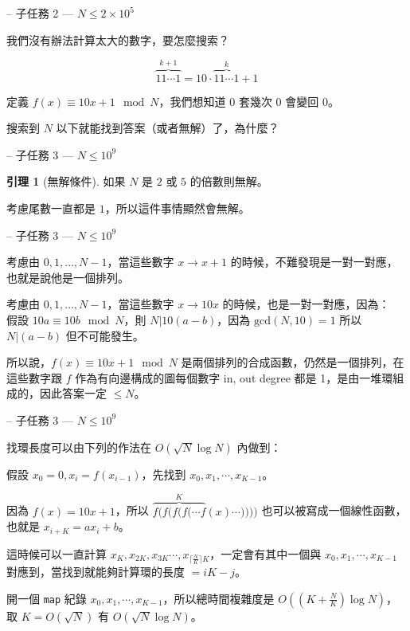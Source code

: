 \documentclass[hyperref,UTF8,notheorems,xcolor={dvipsnames}]{beamer}
\newcommand{\btitle}[1]{{\secname} -- #1}
\theoremstyle{definition}
\newtheorem{lemma}{引理}
\begin{document}
\begin{frame}[fragile]{\btitle{子任務 2 --- $N \leq 2 \times 10^5$}}
	
	我們沒有辦法計算太大的數字，要怎麼搜索？

	{
		\[ \overset{k+1}{\overbrace{11\cdots1}} = 10 \cdot \overset{k}{\overbrace{11\cdots1}} + 1 \]

		定義 $f(x) \equiv 10 x + 1 \mod N$，我們想知道 $0$ 套幾次 $0$ 會變回 $0$。  

		搜索到 $N$ 以下就能找到答案（或者無解）了，為什麼？  
	}

\end{frame}

\begin{frame}[fragile]{\btitle{子任務 3 --- $N \leq 10^9$}}
	
	\begin{lemma}[無解條件]
		如果 $N$ 是 $2$ 或 $5$ 的倍數則無解。  
	\end{lemma}

	考慮尾數一直都是 $1$，所以這件事情顯然會無解。  

\end{frame}

\begin{frame}[fragile]{\btitle{子任務 3 --- $N \leq 10^9$}}
	
	考慮由 $0, 1, \ldots, N - 1$，當這些數字 $x \rightarrow x + 1$ 的時候，不難發現是一對一對應，也就是說他是一個排列。  

	考慮由 $0, 1, \ldots, N - 1$，當這些數字 $x \rightarrow 10x$ 的時候，也是一對一對應，因為：\\
	假設 $10a \equiv 10b \mod N$，則 $N | 10(a - b)$，因為 $\mathrm{gcd}(N, 10) = 1$ 所以 $N | (a - b)$ 但不可能發生。  
	
	所以說，$f(x) \equiv 10 x + 1 \mod N$ 是兩個排列的合成函數，仍然是一個排列，在這些數字跟 $f$ 作為有向邊構成的圖每個數字 in, out degree 都是 1，是由一堆環組成的，因此答案一定 $\leq N$。  

\end{frame}

\begin{frame}[fragile]{\btitle{子任務 3 --- $N \leq 10^9$}}
	
	找環長度可以由下列的作法在 $O(\sqrt N \log N)$ 內做到：  

	假設 $x_0 = 0, x_i = f(x_{i-1})$，先找到 $x_0, x_1, \cdots, x_{K-1}$。  

	因為 $f(x) = 10 x + 1$，所以 $\overset{K}{\overbrace{f(f(f(f(\cdots f}}(x) \cdots))))$ 也可以被寫成一個線性函數，也就是 $x_{i+K} = a x_i + b$。

	這時候可以一直計算 $x_{K}, x_{2K}, x_{3K} \cdots, x_{\lceil\frac N K\rceil K}$，一定會有其中一個與 $x_0, x_1, \cdots, x_{K-1}$ 對應到，當找到就能夠計算環的長度 $= iK - j$。  

	開一個 \texttt{map} 紀錄 $x_0, x_1, \cdots, x_{K-1}$，所以總時間複雜度是 $O((K + \frac N K)\log N)$，取 $K = O(\sqrt N)$ 有 $O(\sqrt N \log N)$。   

\end{frame}
\end{document}
